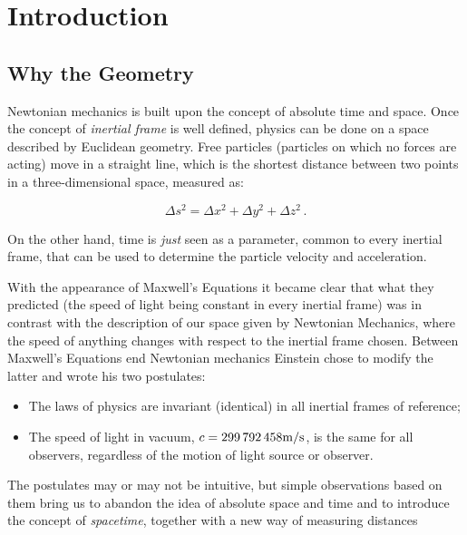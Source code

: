 \section{Introduction}

\subsection{Why the \Sh{} Geometry}

Newtonian mechanics is built upon the concept of absolute time and space.
Once the concept of \textit{inertial frame} is well defined, physics can be
done on a space described by Euclidean geometry.
Free particles (particles on which no forces are acting) move in a straight
line, which is the shortest distance between two points in a three-dimensional
space, measured as:

\begin{equation}
    \Delta s^2 = \Delta x^2 + \Delta y^2 + \Delta z^2 \, .
    \label{eq:euclide}
\end{equation}

On the other hand, time is \textit{just} seen as a parameter, common to every 
inertial frame, that can be used to determine the particle velocity and
acceleration.

With the appearance of Maxwell's Equations it became clear that what they 
predicted (the speed of light being constant in every inertial frame) was in
contrast with the description of our space given by Newtonian Mechanics, where
the speed of anything changes with respect to the inertial frame chosen.
Between Maxwell's Equations end Newtonian mechanics Einstein chose to modify 
the latter and wrote his two postulates:

\begin{itemize}
    \item The laws of physics are invariant (identical) in all inertial frames
        of reference;
    \item The speed of light in vacuum,
        $c = \num{299792458} \unit[per-mode = symbol]{\meter\per\second}$,
        is the same for all observers, regardless of the motion of light source
        or observer.
\end{itemize}

The postulates may or may not be intuitive, but simple observations based on
them bring us to abandon the idea of absolute space and time and to introduce
the concept of \textit{spacetime}, together with a new way of measuring
distances

